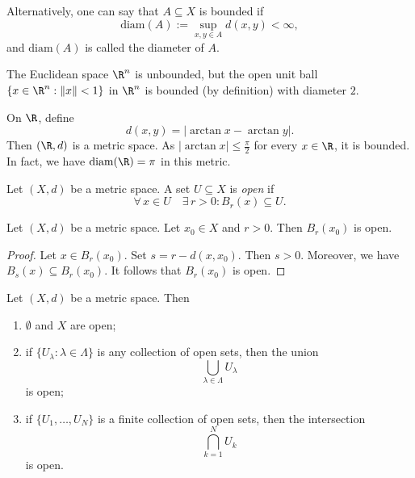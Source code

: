 \begin{remark}
Alternatively, one can say that $A\subseteq X$ is bounded if
\[
\textrm{diam} (A) := \sup_{x ,y \in A} d(x,y) <\infty,
\]
and $\textrm{diam} (A)$ is called the diameter of $A$.

\end{remark}

\np

\begin{example}
The Euclidean space $\R^n$ is unbounded, but the open unit ball
$\{x \in \R^n: \|x\| < 1\}$
in $\R^n$ is bounded (by definition) with diameter $2$.
\end{example}

\bis

\begin{example}
On $\R$, define
\[
d(x,y) = |\arctan x - \arctan y|.
\]
Then $(\R,d)$ is a metric space. As $|\arctan x| \le \frac{\pi}{2}$ for every
$x \in \R$, it is bounded. In fact, we have $\textrm{diam} (\R) = \pi$ in this metric.
\end{example}

\np



\begin{definition}
Let $(X,d)$ be a metric space. A set $U \subseteq X$ is \emph{open} if
\[
\forall \, x \in U \quad \exists \, r > 0 : B_r(x) \subseteq U.
\]
\end{definition}

\bis

\begin{lemma} \label{lemma:balls}
Let $(X,d)$ be a metric space. Let $x_0 \in X$ and $r > 0$. Then $B_r(x_0)$ is open.
\end{lemma}

\begin{proof}
Let $x \in B_r(x_0)$. Set $s = r - d(x,x_0)$. Then $s > 0$. Moreover, we have $B_s(x) \subseteq B_r(x_0)$. It follows that $B_r(x_0)$ is open.
\end{proof}

\np

\begin{theorem} \label{thm:open}
Let $(X,d)$ be a metric space. Then
\begin{enumerate}
\item \label{item1.2.1.i} $\emptyset$ and $X$ are open;
\item \label{item1.2.1.ii} if $\{U_\lambda: \lambda \in \Lambda\}$ is any collection of open sets, then the union
\[
\bigcup_{\lambda \in \Lambda} U_\lambda
\]
is open;
\item \label{item1.2.1.iii} if $\{U_1, \ldots, U_N\}$ is a finite collection of open sets, then the intersection
\[
\bigcap_{k = 1}^N U_k
\]
is open.
\end{enumerate}
\end{theorem}

